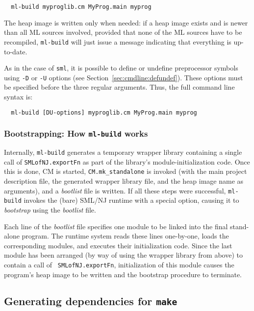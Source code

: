 \documentclass[titlepage,letterpaper]{article}
\begin{document}
\begin{verbatim}
  ml-build myproglib.cm MyProg.main myprog
\end{verbatim}

The heap image is written only when needed: if a heap image exists and
is newer than all ML sources involved, provided that none of the ML
sources have to be recompiled, {\tt ml-build} will just issue a
message indicating that everything is up-to-date.

As in the case of {\tt sml}, it is possible to define or undefine
preprocessor symbols using {\tt -D} or {\tt -U} options (see
Section~\ref{sec:cmdline:defundef}).  These options must be specified
before the three regular arguments.  Thus, the full command line
syntax is:

\begin{verbatim}
  ml-build [DU-options] myproglib.cm MyProg.main myprog
\end{verbatim}

\subsubsection{Bootstrapping: How {\tt ml-build} works}

Internally, {\tt ml-build} generates a temporary wrapper library
containing a single call of {\tt SMLofNJ.exportFn} as part of the
library's module-initialization code.  Once this is done, CM is
started, {\tt CM.mk\_standalone} is invoked (with the main project
description file, the generated wrapper library file, and the heap
image name as arguments), and a {\em bootlist} file is written.
If all these steps were successful, {\tt ml-build} invokes the (bare)
SML/NJ runtime with a special option, causing it to {\em bootstrap}
using the {\em bootlist} file.

Each line of the {\em bootlist} file specifies one module to be linked
into the final stand-alone program.  The runtime system reads these
lines one-by-one, loads the corresponding modules, and executes their
initialization code.  Since the last module has been arranged (by way
of using the wrapper library from above) to contain a call of {\tt
SMLofNJ.exportFn}, initialization of this module causes the program's
heap image to be written and the bootstrap procedure to terminate.

\subsection{Generating dependencies for {\tt make}}
\label{sec:makedepend}
\end{document}
